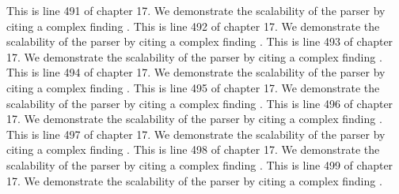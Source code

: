 This is line 491 of chapter 17. We demonstrate the scalability of the parser by citing a complex finding \cite{ref17_491}.
This is line 492 of chapter 17. We demonstrate the scalability of the parser by citing a complex finding \cite{ref17_492}.
This is line 493 of chapter 17. We demonstrate the scalability of the parser by citing a complex finding \cite{ref17_493}.
This is line 494 of chapter 17. We demonstrate the scalability of the parser by citing a complex finding \cite{ref17_494}.
This is line 495 of chapter 17. We demonstrate the scalability of the parser by citing a complex finding \cite{ref17_495}.
This is line 496 of chapter 17. We demonstrate the scalability of the parser by citing a complex finding \cite{ref17_496}.
This is line 497 of chapter 17. We demonstrate the scalability of the parser by citing a complex finding \cite{ref17_497}.
This is line 498 of chapter 17. We demonstrate the scalability of the parser by citing a complex finding \cite{ref17_498}.
This is line 499 of chapter 17. We demonstrate the scalability of the parser by citing a complex finding \cite{ref17_499}.
